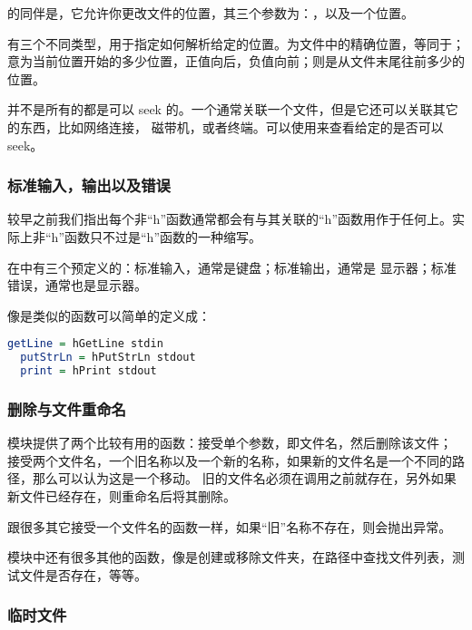 \documentclass[./main.tex]{subfiles}
\begin{document}
的同伴是，它允许你更改文件的位置，其三个参数为：，以及一个位置。

有三个不同类型，用于指定如何解析给定的位置。为文件中的精确位置，等同于；
意为当前位置开始的多少位置，正值向后，负值向前；则是从文件末尾往前多少的位置。

并不是所有的都是可以 seek 的。一个通常关联一个文件，但是它还可以关联其它的东西，比如网络连接，
磁带机，或者终端。可以使用来查看给定的是否可以 seek。

\subsubsection*{标准输入，输出以及错误}

较早之前我们指出每个非“h”函数通常都会有与其关联的“h”函数用作于任何上。实际上非“h”函数只不过是“h”函数的一种缩写。

在中有三个预定义的：标准输入，通常是键盘；标准输出，通常是
显示器；标准错误，通常也是显示器。

像是类似的函数可以简单的定义成：

\begin{lstlisting}[language=Haskell]
  getLine = hGetLine stdin
  putStrLn = hPutStrLn stdout
  print = hPrint stdout
\end{lstlisting}

\subsubsection*{删除与文件重命名}

模块提供了两个比较有用的函数：接受单个参数，即文件名，然后删除该文件；
接受两个文件名，一个旧名称以及一个新的名称，如果新的文件名是一个不同的路径，那么可以认为这是一个移动。
旧的文件名必须在调用之前就存在，另外如果新文件已经存在，则重命名后将其删除。

跟很多其它接受一个文件名的函数一样，如果“旧”名称不存在，则会抛出异常。

模块中还有很多其他的函数，像是创建或移除文件夹，在路径中查找文件列表，测试文件是否存在，等等。

\subsubsection*{临时文件}
\end{document}
